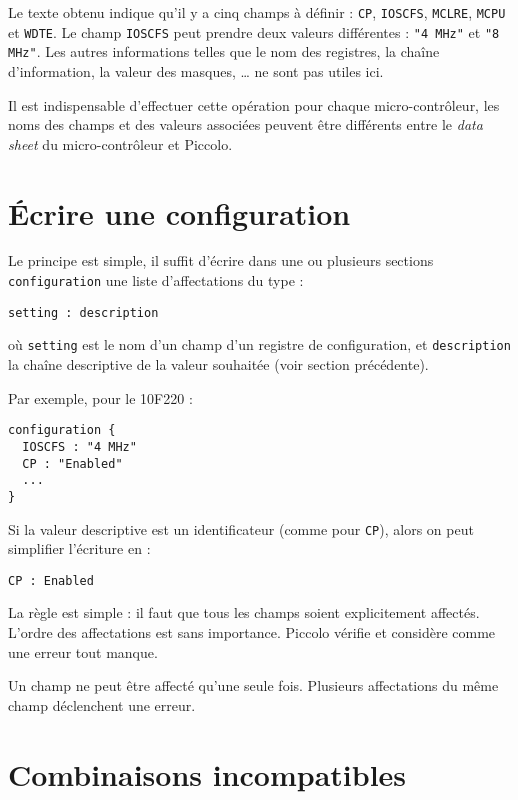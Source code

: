 Le texte obtenu indique qu'il y a cinq champs à définir : \texttt{CP}, \texttt{IOSCFS}, \texttt{MCLRE}, \texttt{MCPU} et \texttt{WDTE}. Le champ \texttt{IOSCFS} peut prendre deux valeurs différentes : \texttt{"4 MHz"} et \texttt{"8 MHz"}. Les autres informations telles que le nom des registres, la chaîne d'information, la valeur des masques, … ne sont pas utiles ici.

Il est indispensable d'effectuer cette opération pour chaque micro-contrôleur, les noms des champs et des valeurs associées peuvent être différents entre le \emph{data sheet} du micro-contrôleur et Piccolo.

\section{Écrire une configuration}

Le principe est simple, il suffit d’écrire dans une ou plusieurs sections \texttt{configuration} une liste d’affectations du type :

\begin{lstlisting}[language=piccolo]
setting : description
\end{lstlisting}

où \texttt{setting} est le nom d’un champ d’un registre de configuration, et \texttt{description} la chaîne descriptive de la valeur souhaitée (voir section précédente).

Par exemple, pour le 10F220 :

\begin{lstlisting}[language=piccolo]
configuration {
  IOSCFS : "4 MHz"
  CP : "Enabled"
  ...
}
\end{lstlisting}

Si la valeur descriptive est un identificateur (comme pour \texttt{CP}), alors on peut simplifier l’écriture en :

\begin{lstlisting}[language=piccolo]
  CP : Enabled
\end{lstlisting}

La règle est simple : il faut que tous les champs soient explicitement affectés. L’ordre des affectations est sans importance. Piccolo vérifie et considère comme une erreur tout manque.

Un champ ne peut être affecté qu’une seule fois. Plusieurs affectations du même champ déclenchent une erreur.


\section{Combinaisons incompatibles}


